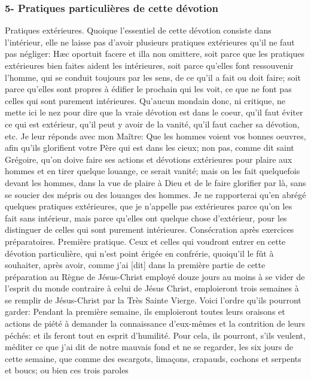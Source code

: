\subsubsection{5- Pratiques particulières de cette dévotion}
Pratiques extérieures.
 Quoique l'essentiel de cette dévotion consiste dans l'intérieur, elle ne laisse pas d'avoir plusieurs pratiques
extérieures qu'il ne faut pas négliger: Hæc oportuit facere et illa non omittere, soit parce que les pratiques
extérieures bien faites aident les intérieures, soit parce qu'elles font ressouvenir l'homme, qui se conduit toujours
par les sens, de ce qu'il a fait ou doit faire; soit parce qu'elles sont propres à édifier le prochain qui les voit, ce que
ne font pas celles qui sont purement intérieures. Qu'aucun mondain donc, ni critique, ne mette ici le nez pour dire
que la vraie dévotion est dans le coeur, qu'il faut éviter ce qui est extérieur, qu'il peut y avoir de la vanité, qu'il faut
cacher sa dévotion, etc. Je leur réponds avec mon Maître: Que les hommes voient vos bonnes oeuvres, afin qu'ils
glorifient votre Père qui est dans les cieux; non pas, comme dit saint Grégoire, qu'on doive faire ses actions et
dévotions extérieures pour plaire aux hommes et en tirer quelque louange, ce serait vanité; mais on les fait
quelquefois devant les hommes, dans la vue de plaire à Dieu et de le faire glorifier par là, sans se soucier des
mépris ou des louanges des hommes. Je ne rapporterai qu'en abrégé quelques pratiques extérieures, que je
n'appelle pas extérieures parce qu'on les fait sans intérieur, mais parce qu'elles ont quelque chose d'extérieur,
pour les distinguer de celles qui sont purement intérieures.
Consécration après exercices préparatoires.
 Première pratique. Ceux et celles qui voudront entrer en cette dévotion particulière, qui n'est point érigée en
confrérie, quoiqu'il le fût à souhaiter, après avoir, comme j'ai [dit] dans la première partie de cette préparation au
Règne de Jésus-Christ employé douze jours au moins à se vider de l'esprit du monde contraire à celui de Jésus Christ, emploieront trois semaines à se remplir de Jésus-Christ par la Très Sainte Vierge. Voici l'ordre qu'ils
pourront garder:
 Pendant la première semaine, ils emploieront toutes leurs oraisons et actions de piété à demander la
connaissance d'eux-mêmes et la contrition de leurs péchés: et ils feront tout en esprit d'humilité. Pour cela, ils
pourront, s'ils veulent, méditer ce que j'ai dit de notre mauvais fond et ne se regarder, les six jours de cette
semaine, que comme des escargots, limaçons, crapauds, cochons et serpents et boucs; ou bien ces trois paroles
